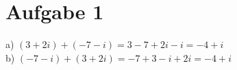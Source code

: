 \documentclass[a4paper, 10pt]{scrartcl}
\begin{document}
\section{Aufgabe 1}

a) $(3 + 2i) + (-7 - i) = 3 - 7 + 2i - i = -4 + i$\\
b) $(-7 - i) + (3 + 2i) = -7 + 3 - i + 2i = -4 + i$\\
\end{document}
